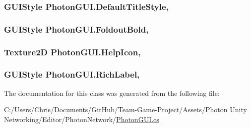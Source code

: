 \subsubsection[{\texorpdfstring{Default\+Title\+Style}{DefaultTitleStyle}}]{\setlength{\rightskip}{0pt plus 5cm}G\+U\+I\+Style Photon\+G\+U\+I.\+Default\+Title\+Style\hspace{0.3cm}{\ttfamily [static]}, {\ttfamily [get]}}\hypertarget{class_photon_g_u_i_a28c0ad75b52cffb47051b71c17bbd64c}{}\label{class_photon_g_u_i_a28c0ad75b52cffb47051b71c17bbd64c}
\subsubsection[{\texorpdfstring{Foldout\+Bold}{FoldoutBold}}]{\setlength{\rightskip}{0pt plus 5cm}G\+U\+I\+Style Photon\+G\+U\+I.\+Foldout\+Bold\hspace{0.3cm}{\ttfamily [static]}, {\ttfamily [get]}}\hypertarget{class_photon_g_u_i_adece5a484564c2a41da79f9a5240ae12}{}\label{class_photon_g_u_i_adece5a484564c2a41da79f9a5240ae12}
\subsubsection[{\texorpdfstring{Help\+Icon}{HelpIcon}}]{\setlength{\rightskip}{0pt plus 5cm}Texture2D Photon\+G\+U\+I.\+Help\+Icon\hspace{0.3cm}{\ttfamily [static]}, {\ttfamily [get]}}\hypertarget{class_photon_g_u_i_af415f8882256bb26872c10e95bdfae31}{}\label{class_photon_g_u_i_af415f8882256bb26872c10e95bdfae31}
\subsubsection[{\texorpdfstring{Rich\+Label}{RichLabel}}]{\setlength{\rightskip}{0pt plus 5cm}G\+U\+I\+Style Photon\+G\+U\+I.\+Rich\+Label\hspace{0.3cm}{\ttfamily [static]}, {\ttfamily [get]}}\hypertarget{class_photon_g_u_i_a41bd2b4e7b457cb4e0c64f07518c4d98}{}\label{class_photon_g_u_i_a41bd2b4e7b457cb4e0c64f07518c4d98}


The documentation for this class was generated from the following file\+:\begin{DoxyCompactItemize}
\item 
C\+:/\+Users/\+Chris/\+Documents/\+Git\+Hub/\+Team-\/\+Game-\/\+Project/\+Assets/\+Photon Unity Networking/\+Editor/\+Photon\+Network/\hyperlink{_photon_g_u_i_8cs}{Photon\+G\+U\+I.\+cs}\end{DoxyCompactItemize}
